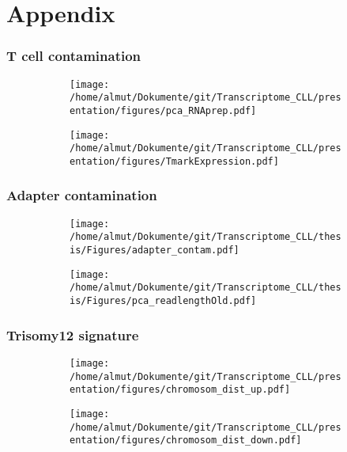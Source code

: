 \documentclass[xcolor=dvipsnames,t,10pt]{beamer}
\begin{document}
\section{Appendix}
\begin{frame}[c]
\frametitle{T cell contamination}
		\begin{figure}
			\centering
			\begin{subfigure}[t]{0.5\columnwidth}
				\texttt{[image: /home/almut/Dokumente/git/Transcriptome\_CLL/presentation/figures/pca\_RNAprep.pdf]}
			\end{subfigure}
			\hfill
			\begin{subfigure}[t]{0.5\columnwidth}
				\texttt{[image: /home/almut/Dokumente/git/Transcriptome\_CLL/presentation/figures/TmarkExpression.pdf]}
			\end{subfigure}
		\end{figure}
\end{frame}
%
%
\begin{frame}[c]
	\frametitle{Adapter contamination}
	\begin{figure}
		\centering
		\begin{subfigure}[t]{0.48\columnwidth}
			\texttt{[image: /home/almut/Dokumente/git/Transcriptome\_CLL/thesis/Figures/adapter\_contam.pdf]}
		\end{subfigure}
		\hfill
		\begin{subfigure}[t]{0.43\columnwidth}
			\texttt{[image: /home/almut/Dokumente/git/Transcriptome\_CLL/thesis/Figures/pca\_readlengthOld.pdf]}
		\end{subfigure}
	\end{figure}
\end{frame}
%
%
\begin{frame}[c]
	\frametitle{Trisomy12 signature}
	\begin{figure}
		\centering
		\begin{subfigure}[t]{0.45\columnwidth}
			\texttt{[image: /home/almut/Dokumente/git/Transcriptome\_CLL/presentation/figures/chromosom\_dist\_up.pdf]}
		\end{subfigure}
		\hfill
		\begin{subfigure}[t]{0.45\columnwidth}
			\texttt{[image: /home/almut/Dokumente/git/Transcriptome\_CLL/presentation/figures/chromosom\_dist\_down.pdf]}
		\end{subfigure}
	\end{figure}
\end{frame}
%
%
\end{document}
